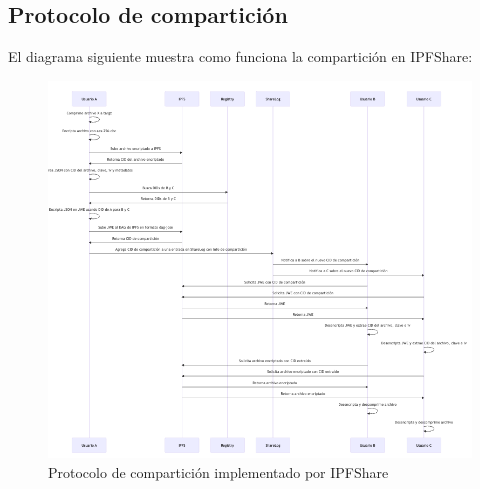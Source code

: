 \subsection{Protocolo de compartición}\label{ssect:protocolocomparticion}

El diagrama siguiente muestra como funciona la compartición en IPFShare:
\begin{figure}[H]
  \centering
  \includegraphics[width=\textwidth]{images/protocoloIpfshare.png}
  \caption{Protocolo de compartición implementado por IPFShare}
  \label{fig:ipfshareprotocol}
\end{figure}

